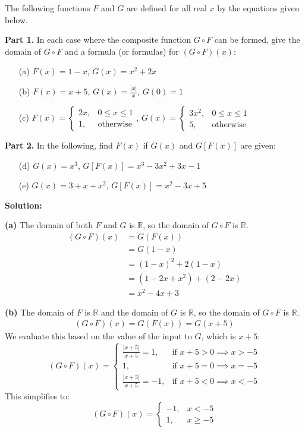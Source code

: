 \begin{problembox}
The following functions \( F \) and \( G \) are defined for all real \( x \) by the equations given below. 

\textbf{Part 1.} In each case where the composite function \( G \circ F \) can be formed, give the domain of \( G \circ F \) and a formula (or formulas) for \( (G \circ F)(x) \):
\begin{itemize}
\item[(a)] \( F(x) = 1 - x \), \quad \( G(x) = x^2 + 2x \)
\item[(b)] \( F(x) = x + 5 \), \quad \( G(x) = \frac{|x|}{x} \), \( G(0) = 1 \)
\item[(c)] \( F(x) = \begin{cases} 2x, & 0 \le x \le 1 \\ 1, & \text{otherwise} \end{cases} \),  
\( G(x) = \begin{cases} 3x^2, & 0 \le x \le 1 \\ 5, & \text{otherwise} \end{cases} \)
\end{itemize}
\textbf{Part 2.} In the following, find \( F(x) \) if \( G(x) \) and \( G[F(x)] \) are given:
\begin{itemize}
\item[(d)] \( G(x) = x^3 \), \quad \( G[F(x)] = x^3 - 3x^2 + 3x - 1 \)
\item[(e)] \( G(x) = 3 + x + x^2 \), \quad \( G[F(x)] = x^2 - 3x + 5 \)
\end{itemize}
\end{problembox}

\textbf{Solution:}

\textbf{(a)}
The domain of both \(F\) and \(G\) is \(\mathbb{R}\), so the domain of \(G \circ F\) is \(\mathbb{R}\).
\begin{align*}
(G \circ F)(x) &= G(F(x)) \\
&= G(1-x) \\
&= (1-x)^2 + 2(1-x) \\
&= (1 - 2x + x^2) + (2 - 2x) \\
&= x^2 - 4x + 3
\end{align*}

\textbf{(b)}
The domain of \(F\) is \(\mathbb{R}\) and the domain of \(G\) is \(\mathbb{R}\), so the domain of \(G \circ F\) is \(\mathbb{R}\).
\begin{align*}
(G \circ F)(x) = G(F(x)) = G(x+5)
\end{align*}
We evaluate this based on the value of the input to \(G\), which is \(x+5\):
\[ (G \circ F)(x) = 
\begin{cases} 
\frac{|x+5|}{x+5} = 1, & \text{if } x+5 > 0 \implies x > -5 \\
1, & \text{if } x+5 = 0 \implies x = -5 \\
\frac{|x+5|}{x+5} = -1, & \text{if } x+5 < 0 \implies x < -5 
\end{cases}
\]
This simplifies to:
\[ (G \circ F)(x) = \begin{cases} -1, & x < -5 \\ 1, & x \ge -5 \end{cases} \]


